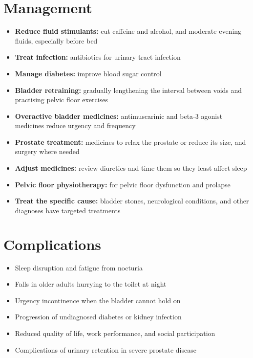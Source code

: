 \section*{Management}
\begin{itemize}
    \item \textbf{Reduce fluid stimulants:} cut caffeine and alcohol, and moderate evening fluids, especially before bed
    \item \textbf{Treat infection:} antibiotics for urinary tract infection
    \item \textbf{Manage diabetes:} improve blood sugar control
    \item \textbf{Bladder retraining:} gradually lengthening the interval between voids and practising pelvic floor exercises
    \item \textbf{Overactive bladder medicines:} antimuscarinic and beta-3 agonist medicines reduce urgency and frequency
    \item \textbf{Prostate treatment:} medicines to relax the prostate or reduce its size, and surgery where needed
    \item \textbf{Adjust medicines:} review diuretics and time them so they least affect sleep
    \item \textbf{Pelvic floor physiotherapy:} for pelvic floor dysfunction and prolapse
    \item \textbf{Treat the specific cause:} bladder stones, neurological conditions, and other diagnoses have targeted treatments
\end{itemize}

\section*{Complications}
\begin{itemize}
    \item Sleep disruption and fatigue from nocturia
    \item Falls in older adults hurrying to the toilet at night
    \item Urgency incontinence when the bladder cannot hold on
    \item Progression of undiagnosed diabetes or kidney infection
    \item Reduced quality of life, work performance, and social participation
    \item Complications of urinary retention in severe prostate disease
\end{itemize}

